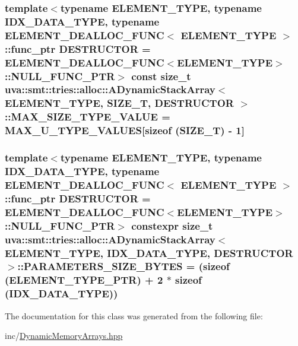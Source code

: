 \subsubsection[{M\+A\+X\+\_\+\+S\+I\+Z\+E\+\_\+\+T\+Y\+P\+E\+\_\+\+V\+A\+L\+U\+E}]{\setlength{\rightskip}{0pt plus 5cm}template$<$typename E\+L\+E\+M\+E\+N\+T\+\_\+\+T\+Y\+P\+E, typename I\+D\+X\+\_\+\+D\+A\+T\+A\+\_\+\+T\+Y\+P\+E, typename E\+L\+E\+M\+E\+N\+T\+\_\+\+D\+E\+A\+L\+L\+O\+C\+\_\+\+F\+U\+N\+C$<$ E\+L\+E\+M\+E\+N\+T\+\_\+\+T\+Y\+P\+E $>$\+::func\+\_\+ptr D\+E\+S\+T\+R\+U\+C\+T\+O\+R = E\+L\+E\+M\+E\+N\+T\+\_\+\+D\+E\+A\+L\+L\+O\+C\+\_\+\+F\+U\+N\+C$<$\+E\+L\+E\+M\+E\+N\+T\+\_\+\+T\+Y\+P\+E$>$\+::\+N\+U\+L\+L\+\_\+\+F\+U\+N\+C\+\_\+\+P\+T\+R$>$ const size\+\_\+t {\bf uva\+::smt\+::tries\+::alloc\+::\+A\+Dynamic\+Stack\+Array}$<$ E\+L\+E\+M\+E\+N\+T\+\_\+\+T\+Y\+P\+E, S\+I\+Z\+E\+\_\+\+T, D\+E\+S\+T\+R\+U\+C\+T\+O\+R $>$\+::M\+A\+X\+\_\+\+S\+I\+Z\+E\+\_\+\+T\+Y\+P\+E\+\_\+\+V\+A\+L\+U\+E = M\+A\+X\+\_\+\+U\+\_\+\+T\+Y\+P\+E\+\_\+\+V\+A\+L\+U\+E\+S\mbox{[}sizeof (S\+I\+Z\+E\+\_\+\+T) -\/ 1\mbox{]}\hspace{0.3cm}{\ttfamily [static]}}\label{classuva_1_1smt_1_1tries_1_1alloc_1_1_a_dynamic_stack_array_a841c671cad5fe18ade9dad6bd3b14ae9}
\hypertarget{classuva_1_1smt_1_1tries_1_1alloc_1_1_a_dynamic_stack_array_aef5ee708f10cc28e45ba71994b1fb587}{}
\subsubsection[{P\+A\+R\+A\+M\+E\+T\+E\+R\+S\+\_\+\+S\+I\+Z\+E\+\_\+\+B\+Y\+T\+E\+S}]{\setlength{\rightskip}{0pt plus 5cm}template$<$typename E\+L\+E\+M\+E\+N\+T\+\_\+\+T\+Y\+P\+E, typename I\+D\+X\+\_\+\+D\+A\+T\+A\+\_\+\+T\+Y\+P\+E, typename E\+L\+E\+M\+E\+N\+T\+\_\+\+D\+E\+A\+L\+L\+O\+C\+\_\+\+F\+U\+N\+C$<$ E\+L\+E\+M\+E\+N\+T\+\_\+\+T\+Y\+P\+E $>$\+::func\+\_\+ptr D\+E\+S\+T\+R\+U\+C\+T\+O\+R = E\+L\+E\+M\+E\+N\+T\+\_\+\+D\+E\+A\+L\+L\+O\+C\+\_\+\+F\+U\+N\+C$<$\+E\+L\+E\+M\+E\+N\+T\+\_\+\+T\+Y\+P\+E$>$\+::\+N\+U\+L\+L\+\_\+\+F\+U\+N\+C\+\_\+\+P\+T\+R$>$ constexpr size\+\_\+t {\bf uva\+::smt\+::tries\+::alloc\+::\+A\+Dynamic\+Stack\+Array}$<$ E\+L\+E\+M\+E\+N\+T\+\_\+\+T\+Y\+P\+E, I\+D\+X\+\_\+\+D\+A\+T\+A\+\_\+\+T\+Y\+P\+E, D\+E\+S\+T\+R\+U\+C\+T\+O\+R $>$\+::P\+A\+R\+A\+M\+E\+T\+E\+R\+S\+\_\+\+S\+I\+Z\+E\+\_\+\+B\+Y\+T\+E\+S = (sizeof ({\bf E\+L\+E\+M\+E\+N\+T\+\_\+\+T\+Y\+P\+E\+\_\+\+P\+T\+R}) + 2 $\ast$ sizeof (I\+D\+X\+\_\+\+D\+A\+T\+A\+\_\+\+T\+Y\+P\+E))\hspace{0.3cm}{\ttfamily [static]}}\label{classuva_1_1smt_1_1tries_1_1alloc_1_1_a_dynamic_stack_array_aef5ee708f10cc28e45ba71994b1fb587}


The documentation for this class was generated from the following file\+:\begin{DoxyCompactItemize}
\item 
inc/\hyperlink{_dynamic_memory_arrays_8hpp}{Dynamic\+Memory\+Arrays.\+hpp}\end{DoxyCompactItemize}
